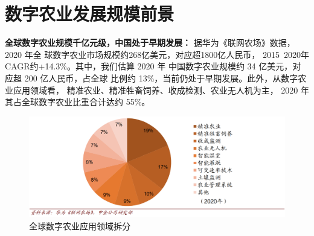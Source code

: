 \documentclass[a4paper]{article}
\begin{document}
\section{数字农业发展规模前景}
\textbf{全球数字农业规模千亿元级，中国处于早期发展：}
据华为《联网农场》数据，2020 年全
球数字农业市场规模约268亿美元，对应超1800亿人民币，
2015~2020年CAGR约+14.3\%。其中，我们估算 2020 年
中国数字农业规模约 34 亿美元，对应超 200 亿人民币，占全球
比例约 13\%，当前仍处于早期发展。此外，从数字农业应用领域看，
精准农业、精准牲畜饲养、收成检测、农业无人机为主，
2020 年其占全球数字农业比重合计达约 55\%。

\newpage
\begin{figure}[htbp]
	\centering
	\quad
\end{figure}
\begin{figure}[h]
	\centering
	\includegraphics[scale=0.5]{caifen.png}
	\caption{全球数字农业应用领域拆分}
\end{figure}
\end{document}
